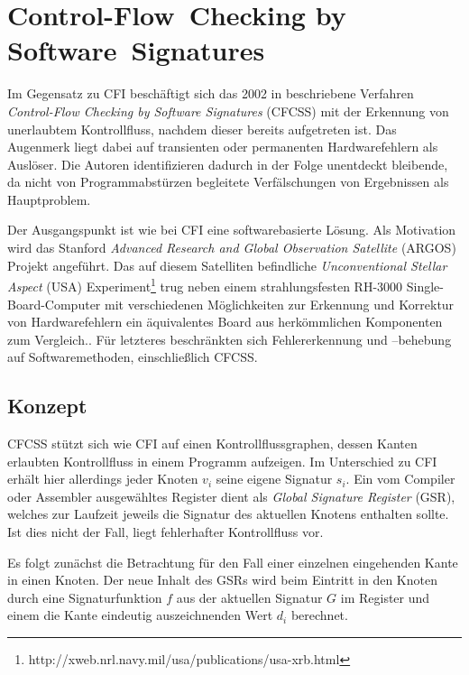 \documentclass[11pt]{article}
\begin{document}

\section{Control-Flow~Checking by Software~Signatures}


Im Gegensatz zu CFI beschäftigt sich das 2002 in \cite{oh-2002-control}
beschriebene Verfahren \emph{Control-Flow Checking by Software Signatures}
(CFCSS) mit der Erkennung von unerlaubtem Kontrollfluss, nachdem dieser bereits
aufgetreten ist. Das Augenmerk liegt dabei auf transienten oder permanenten
Hardwarefehlern als Auslöser. Die Autoren identifizieren dadurch in der Folge
unentdeckt bleibende, da nicht von Programmabstürzen begleitete Verfälschungen
von Ergebnissen als Hauptproblem.

Der Ausgangspunkt ist wie bei CFI eine softwarebasierte Lösung. Als Motivation
wird das Stanford \emph{Advanced Research and Global Observation Satellite}
(ARGOS) Projekt angeführt. Das auf diesem Satelliten befindliche
\emph{Unconventional Stellar Aspect} (USA)
Experiment\footnote{http://xweb.nrl.navy.mil/usa/publications/usa-xrb.html}
trug neben einem strahlungsfesten RH-3000 Single-Board-Computer mit
verschiedenen Möglichkeiten zur Erkennung und Korrektur von Hardwarefehlern ein
äquivalentes Board aus herkömmlichen Komponenten zum
Vergleich.\cite{argos-2002-lessons}. Für letzteres beschränkten sich
Fehlererkennung und –behebung auf Softwaremethoden, einschließlich CFCSS.

\subsection{Konzept}

CFCSS stützt sich wie CFI auf einen Kontrollflussgraphen, dessen Kanten
erlaubten Kontrollfluss in einem Programm aufzeigen. Im Unterschied zu CFI
erhält hier allerdings jeder Knoten $v_i$ seine eigene Signatur $s_i$. Ein vom
Compiler oder Assembler ausgewähltes Register dient als \emph{Global Signature
Register} (GSR), welches zur Laufzeit jeweils die Signatur des aktuellen
Knotens enthalten sollte. Ist dies nicht der Fall, liegt fehlerhafter
Kontrollfluss vor.

Es folgt zunächst die Betrachtung für den Fall einer einzelnen eingehenden
Kante in einen Knoten. Der neue Inhalt des GSRs wird beim Eintritt in den
Knoten durch eine Signaturfunktion $f$ aus der aktuellen Signatur $G$ im
Register und einem die Kante eindeutig auszeichnenden Wert $d_i$ berechnet.
\end{document}

